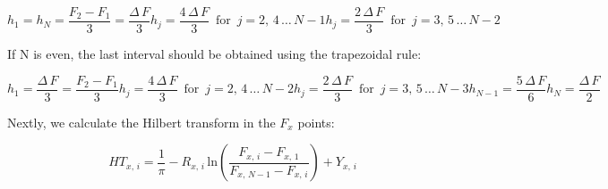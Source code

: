 \documentclass[12pt,twoside,a4paper]{article}
\numberwithin{equation}{subsection}
\numberwithin{figure}{subsection}
\begin{document}
\begin{subequations} \label{eq:htran_nodd}
  \begin{equation}   \label{eq:hnodd_fnlast}
    {h_{1}} = {h_{N}} = \frac {{F_{2}} - {F_{1}}}{3} = \frac {\Delta \,F}{3}
  \end{equation}
  \begin{equation}   \label{eq:hnodd_even}
    {h_{j}} = \frac {4\,\Delta \,F}{3}  \,\mbox{ for } \,j=2, \,4\,\ldots\,{N - 1}
  \end{equation}
  \begin{equation}   \label{eq:hnodd_odd}
    {h_{j}} = \frac {2\,\Delta \,F}{3}  \,\mbox{ for } \,j=3, \,5\,\ldots\,{N - 2}
  \end{equation}
\end{subequations}

If N is even, the last interval should be obtained using the trapezoidal rule:

\begin{subequations} \label{eq:htran_neven}
  \begin{equation}   \label{eq:hneven_first}
    {h_{1}} = \frac {\Delta \,F}{3} = \frac {{F_{2}} - {F_{1}}}{3}
  \end{equation}
  \begin{equation}   \label{eq:hneven_even}
    {h_{j}}=\frac {4\,\Delta \,F}{3}  \,\mbox{ for } \,j=2, \,4\,\ldots\,{N - 2}
  \end{equation}
  \begin{equation}   \label{eq:hneven_odd}
    {h_{j}}=\frac {2\,\Delta \,F}{3}  \,\mbox{ for } \,j=3, \,5\,\ldots\,{N - 3}
  \end{equation}
   \begin{equation}   \label{eq:hneven_prelast}
    {h_{N - 1}} = \frac {5\,\Delta \,F}{6}
  \end{equation}
   \begin{equation}   \label{eq:hneven_last}
    {h_{N}} = \frac {\Delta \,F}{2}
  \end{equation}
\end{subequations}

Nextly, we calculate the Hilbert transform in the ${F_{x}}$ points:

\begin{equation} \label{eq:htran_htpoints}
  {HT_{x, \,i}}=\frac {1}{\pi } - {R_{x, \,i}}\,\mathrm{ln}(\frac {{F_{x, \,i}} - {F_{x, \,1}}}{{F_{x, \,N - 1}} - {F_{x, \,i}}})
  + {Y_{x, \,i}}
\end{equation}
\end{document}
